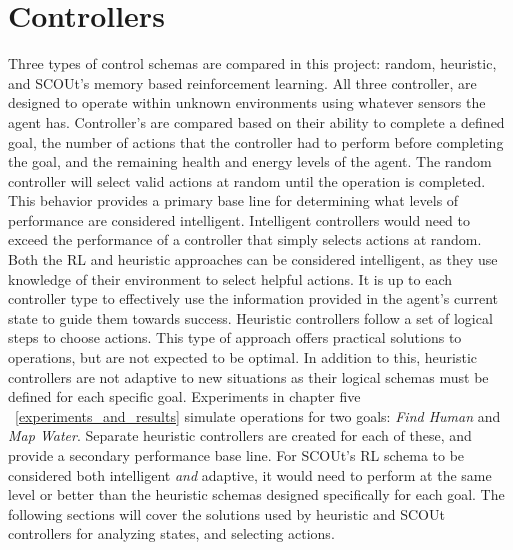 

\chapter{Controllers} \label{controllers}
Three types of control schemas are compared in this project: random, heuristic, and SCOUt's memory based reinforcement learning.
All three controller, are designed to operate within unknown environments using whatever sensors the agent has.
Controller's are compared based on their ability to complete a defined goal, the number of actions that the controller had to perform before completing the goal, and the remaining health and energy levels of the agent.
The random controller will select valid actions at random until the operation is completed.
This behavior provides a primary base line for determining what levels of performance are considered intelligent.
Intelligent controllers would need to exceed the performance of a controller that simply selects actions at random.
Both the RL and heuristic approaches can be considered intelligent, as they use knowledge of their environment to select helpful actions.
It is up to each controller type to effectively use the information provided in the agent's current state to guide them towards success.
Heuristic controllers follow a set of logical steps to choose actions.
This type of approach offers practical solutions to operations, but are not expected to be optimal.
In addition to this, heuristic controllers are not adaptive to new situations as their logical schemas must be defined for each specific goal.
Experiments in chapter five ~\ref{experiments_and_results} simulate operations for two goals: \textit{Find Human} and \textit{Map Water}.
Separate heuristic controllers are created for each of these, and provide a secondary performance base line.
For SCOUt's RL schema to be considered both intelligent \textit{and} adaptive, it would need to perform at the same level or better than the heuristic schemas designed specifically for each goal.
The following sections will cover the solutions used by heuristic and SCOUt controllers for analyzing states, and selecting actions.


